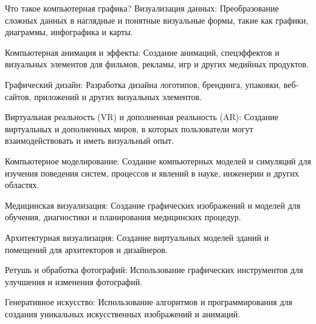 \documentclass{beamer}
\begin{document}
\begin{frame}{Что такое компьютерная графика?}
		Визуализация данных: Преобразование сложных данных в наглядные и понятные визуальные формы, такие как графики, диаграммы, инфографика и карты.
		
		Компьютерная анимация и эффекты: Создание анимаций, спецэффектов и визуальных элементов для фильмов, рекламы, игр и других медийных продуктов.
		
		Графический дизайн: Разработка дизайна логотипов, брендинга, упаковки, веб-сайтов, приложений и других визуальных элементов.
		
		Виртуальная реальность (VR) и дополненная реальность (AR): Создание виртуальных и дополненных миров, в которых пользователи могут взаимодействовать и иметь визуальный опыт.
		
		Компьютерное моделирование: Создание компьютерных моделей и симуляций для изучения поведения систем, процессов и явлений в науке, инженерии и других областях.
		
		Медицинская визуализация: Создание графических изображений и моделей для обучения, диагностики и планирования медицинских процедур.
		
		Архитектурная визуализация: Создание виртуальных моделей зданий и помещений для архитекторов и дизайнеров.
		
		Ретушь и обработка фотографий: Использование графических инструментов для улучшения и изменения фотографий.
		
		Генеративное искусство: Использование алгоритмов и программирования для создания уникальных искусственных изображений и анимаций.
		\fi
		
	\end{frame}
	
\end{document}
